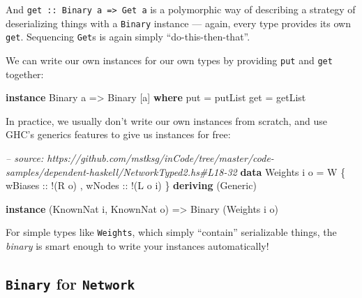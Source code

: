 \documentclass[]{article}
\newenvironment{Shaded}{}{}
\newcommand{\KeywordTok}[1]{\textcolor[rgb]{0.00,0.44,0.13}{\textbf{{#1}}}}
\newcommand{\DataTypeTok}[1]{\textcolor[rgb]{0.56,0.13,0.00}{{#1}}}
\newcommand{\CommentTok}[1]{\textcolor[rgb]{0.38,0.63,0.69}{\textit{{#1}}}}
\newcommand{\OtherTok}[1]{\textcolor[rgb]{0.00,0.44,0.13}{{#1}}}
\newcommand{\FunctionTok}[1]{\textcolor[rgb]{0.02,0.16,0.49}{{#1}}}
\newcommand{\NormalTok}[1]{{#1}}
\begin{document}
And \texttt{get\ ::\ Binary\ a\ =\textgreater{}\ Get\ a} is a polymorphic way of
describing a strategy of deserializing things with a \texttt{Binary} instance
--- again, every type provides its own \texttt{get}. Sequencing \texttt{Get}s is
again simply ``do-this-then-that''.

We can write our own instances for our own types by providing \texttt{put} and
\texttt{get} together:

\begin{Shaded}
\begin{Highlighting}[]
\KeywordTok{instance} \DataTypeTok{Binary} \NormalTok{a }\OtherTok{=>} \DataTypeTok{Binary} \NormalTok{[a] }\KeywordTok{where}
    \NormalTok{put }\FunctionTok{=} \NormalTok{putList}
    \NormalTok{get }\FunctionTok{=} \NormalTok{getList}
\end{Highlighting}
\end{Shaded}

In practice, we usually don't write our own instances from scratch, and use
GHC's generics features to give us instances for free:

\begin{Shaded}
\begin{Highlighting}[]
\CommentTok{-- source: https://github.com/mstksg/inCode/tree/master/code-samples/dependent-haskell/NetworkTyped2.hs#L18-32}
\KeywordTok{data} \DataTypeTok{Weights} \NormalTok{i o }\FunctionTok{=} \DataTypeTok{W} \NormalTok{\{}\OtherTok{ wBiases ::} \FunctionTok{!}\NormalTok{(}\DataTypeTok{R} \NormalTok{o)}
                     \NormalTok{,}\OtherTok{ wNodes  ::} \FunctionTok{!}\NormalTok{(}\DataTypeTok{L} \NormalTok{o i)}
                     \NormalTok{\}}
  \KeywordTok{deriving} \NormalTok{(}\DataTypeTok{Generic}\NormalTok{)}

\KeywordTok{instance} \NormalTok{(}\DataTypeTok{KnownNat} \NormalTok{i, }\DataTypeTok{KnownNat} \NormalTok{o) }\OtherTok{=>} \DataTypeTok{Binary} \NormalTok{(}\DataTypeTok{Weights} \NormalTok{i o)}
\end{Highlighting}
\end{Shaded}

For simple types like \texttt{Weights}, which simply ``contain'' serializable
things, the \emph{binary} is smart enough to write your instances automatically!

\subsection{\texorpdfstring{\texttt{Binary} for
\texttt{Network}}{Binary for Network}}\label{binary-for-network}
\end{document}
